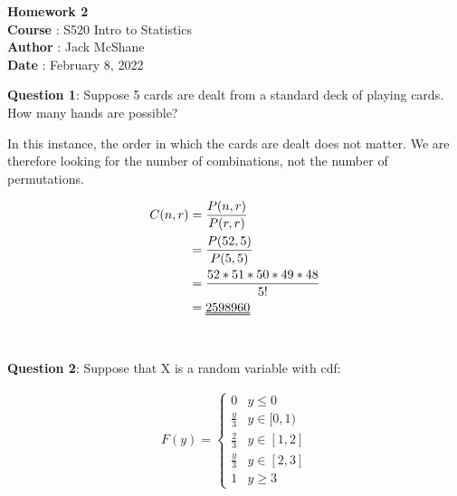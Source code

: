 \documentclass[letterpaper,12pt]{article}
\begin{document}
\begin{flushleft}
    \textbf{Homework 2} \\
    \textbf{Course }: S520 Intro to Statistics \\
    \textbf{Author }: Jack McShane \\
    \textbf{Date }: February 8, 2022 \\
\end{flushleft}

\begin{flushleft}
\textbf{Question 1}: Suppose 5 cards are dealt from a standard deck of playing cards. How many hands are possible?
\end{flushleft}
\begin{center}
    In this instance, the order in which the cards are dealt does not matter. We are therefore looking for the number of combinations, not the number of permutations.
\end{center}
\begin{align*}
    C(n,r) &= \frac{P(n,r)}{P(r,r)}\\
    &=\frac{P(52,5)}{P(5,5)}\\
    &=\frac{52*51*50*49*48}{5!} \\
    &=\uuline{2598960}
\end{align*} \\


\begin{flushleft}
\textbf{Question 2}: Suppose that X is a random variable with cdf:
\end{flushleft}
\begin{align*}
    F(y) = 
    \begin{cases}
        0 & y \leq 0 \\
        \frac{y}{3} & y \in [0, 1) \\
        \frac{2}{3} & y \in [1, 2] \\
        \frac{y}{3} & y \in [2, 3] \\
        1 & y \geq 3
    \end{cases}
\end{align*}
\end{document}

